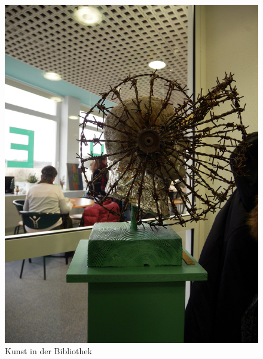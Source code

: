 \documentclass[a4paper,
fontsize=11pt,
oneside,
numbers=noperiodatend,
parskip=half-,
bibliography=totoc,
final
]{scrartcl}
\begin{document}
\begin{figure}
\centering
\includegraphics{img/image_6.jpg}
\caption{Kunst in der Bibliothek}
\end{figure}
\end{document}
